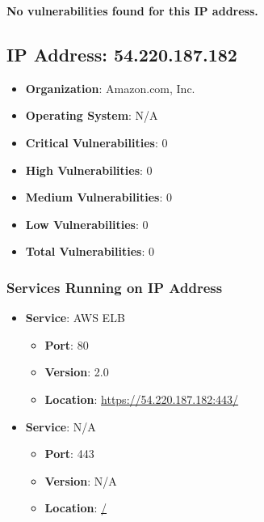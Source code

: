\documentclass{article}
\begin{document}
\textbf{No vulnerabilities found for this IP address.}




\clearpage



\subsection{IP Address: 54.220.187.182}

\begin{itemize}
    \item \textbf{Organization}: Amazon.com, Inc.
    \item \textbf{Operating System}:  N/A 
    \item \textbf{Critical Vulnerabilities}: 0
    \item \textbf{High Vulnerabilities}: 0
    \item \textbf{Medium Vulnerabilities}: 0
    \item \textbf{Low Vulnerabilities}: 0
    \item \textbf{Total Vulnerabilities}: 0
\end{itemize}

\subsubsection*{Services Running on IP Address}

\begin{itemize}
    
        \item \textbf{Service}: AWS ELB
        \begin{itemize}
            \item \textbf{Port}: 80
            \item \textbf{Version}:  2.0 
            \item \textbf{Location}: \href{ https://54.220.187.182:443/ }{ https://54.220.187.182:443/ }
        \end{itemize}
    
        \item \textbf{Service}: N/A
        \begin{itemize}
            \item \textbf{Port}: 443
            \item \textbf{Version}:  N/A 
            \item \textbf{Location}: \href{ / }{ / }
        \end{itemize}
    
\end{itemize}
\end{document}
